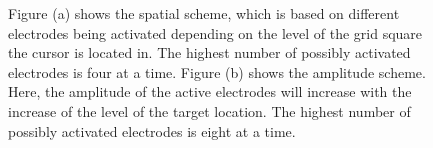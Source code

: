 \begin{figure}
	\caption{Figure (a) shows the spatial scheme, which is based on different electrodes being activated depending on the level of the grid square the cursor is located in. The highest number of possibly activated electrodes is four at a time. Figure (b) shows the amplitude scheme. Here, the amplitude of the active electrodes will increase with the increase of the level of the target location. The highest number of possibly activated electrodes is eight at a time.}
	\label{fig:sensconfigs}
\end{figure}

